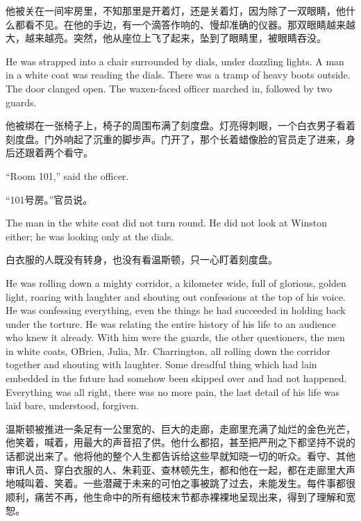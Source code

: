 \begin{paracol}{2}
他被关在一间牢房里，不知那里是开着灯，还是关着灯，因为除了一双眼睛，他什么都看不见。在他的手边，有一个滴答作响的、慢却准确的仪器。那双眼睛越来越大，越来越亮。突然，他从座位上飞了起来，坠到了眼睛里，被眼睛吞没。

\switchcolumn*

He was strapped into a chair surrounded by dials, under dazzling lights.
A man in a white coat was reading the dials. There was a tramp of heavy
boots outside. The door clanged open. The waxen-faced officer marched
in, followed by two guards.

\switchcolumn

他被绑在一张椅子上，椅子的周围布满了刻度盘。灯亮得刺眼，一个白衣男子看着刻度盘。门外响起了沉重的脚步声。门开了，那个长着蜡像脸的官员走了进来，身后还跟着两个看守。

\switchcolumn*

``Room 101,'' said the officer.

\switchcolumn

``101号房。''官员说。

\switchcolumn*

The man in the white coat did not turn round. He did not look at Winston
either; he was looking only at the dials.

\switchcolumn

白衣服的人既没有转身，也没有看温斯顿，只一心盯着刻度盘。

\switchcolumn*

He was rolling down a mighty corridor, a kilometer wide, full of
glorious, golden light, roaring with laughter and shouting out
confessions at the top of his voice. He was confessing everything, even
the things he had succeeded in holding back under the torture. He was
relating the entire history of his life to an audience who knew it
already. With him were the guards, the other questioners, the men in
white coats, O\textquotesingle Brien, Julia, Mr. Charrington, all
rolling down the corridor together and shouting with laughter. Some
dreadful thing which had lain embedded in the future had somehow been
skipped over and had not happened. Everything was all right, there was
no more pain, the last detail of his life was laid bare, understood,
forgiven.

\switchcolumn

温斯顿被推进一条足有一公里宽的、巨大的走廊，走廊里充满了灿烂的金色光芒，他笑着，喊着，用最大的声音招了供。他什么都招，甚至把严刑之下都坚持不说的话都说出来了。他将他的整个人生都告诉给这些早就知晓一切的听众。看守、其他审讯人员、穿白衣服的人、朱莉亚、查林顿先生，都和他在一起，都在走廊里大声地喊叫着、笑着。一些潜藏于未来的可怕之事被跳了过去，未能发生。每件事都很顺利，痛苦不再，他生命中的所有细枝末节都赤裸裸地呈现出来，得到了理解和宽恕。


\end{paracol}
